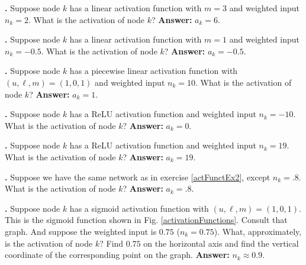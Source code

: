 \noindent
{\bf \theActFunctionCounter.} Suppose node $k$ has a linear activation function with
$m=3$ and weighted input $n_k = 2$. What is the activation of node $k$? {\bf 
Answer:} $a_k=6$.

\bigskip

\noindent
{\bf \theActFunctionCounter.} Suppose node $k$ has a linear activation function with
$m=1$ and weighted input $n_k = -0.5$. What is the activation of node $k$? {\bf 
Answer:} $a_k = -0.5$.

\bigskip


\label{actFunctEx2}
\noindent
{\bf \theActFunctionCounter.} Suppose node $k$ has a piecewise linear activation function with $(u,\ell,m) = (1,0,1)$ and weighted input $n_k = 10$. What is the activation of node $k$? {\bf 
Answer:} $a_k = 1$.

\bigskip

\noindent
{\bf \theActFunctionCounter.} Suppose node $k$ has a ReLU activation function and weighted input $n_k = -10$. What is the activation of node $k$? {\bf 
Answer:} $a_k = 0$.

\bigskip


\label{actFunctEx2}
\noindent
{\bf \theActFunctionCounter.} Suppose node $k$ has a ReLU activation function and weighted input $n_k = 19$. What is the activation of node $k$? {\bf 
Answer:} $a_k = 19$.

\bigskip

\noindent
{\bf \theActFunctionCounter.} Suppose we have the same network as in exercise \ref{actFunctEx2}, except $n_k = .8$. What is the activation of node $k$? {\bf Answer:} $a_k = .8$.

\bigskip

\label{actFunctEx3}
\noindent
{\bf \theActFunctionCounter.} Suppose node $k$ has a sigmoid activation function
with $(u,\ell,m) = (1,0,1)$. This is the sigmoid function shown in Fig. 
\ref{activationFunctions}. Consult that graph. And suppose the weighted input is 
$0.75$ ($n_k = 0.75$). What, approximately, is the activation of node $k$?  
Find $0.75$ on the horizontal axis and find the vertical coordinate of the 
corresponding point on the graph. {\bf Answer:} $n_k \approx 0.9$.

